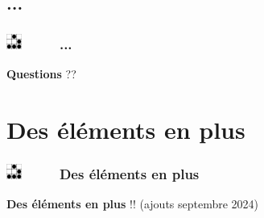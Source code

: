 \documentclass[slidetop,11pt]{beamer}
\def\sectionPartIVe{...}
\def\sectionPartV{Des {\'e}l{\'e}ments en plus}
\def\moreInFrameTitle{\includegraphics[height=0.5cm]{img/logo_glider.png}~~~~~}
\begin{document}
\subsection{\sectionPartIVe}
\begin{frame}
	\frametitle{\moreInFrameTitle \sectionPartIVe}
	{\centering \textbf{Questions} ?? }
\end{frame} 

\section{\sectionPartV}
\begin{frame}
	\frametitle{\moreInFrameTitle \sectionPartV}
	{\centering \textbf{Des {\'e}l{\'e}ments en plus} !! (ajouts septembre 2024) }
\end{frame} 
\end{document}
